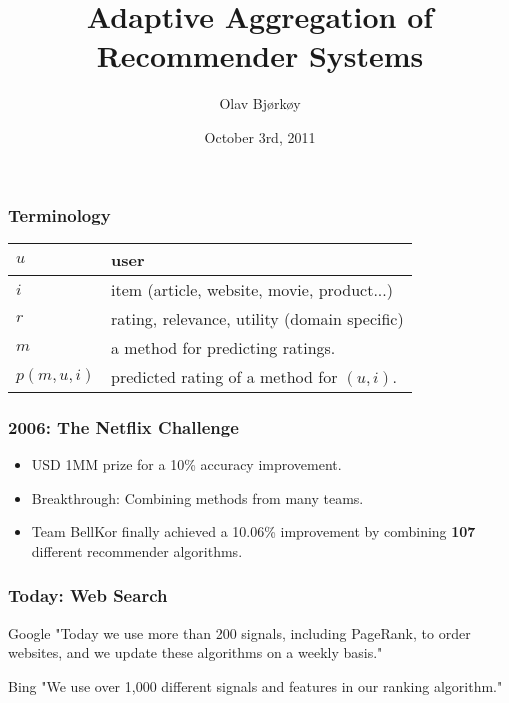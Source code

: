 \documentclass[screen]{beamer}
\title[Adaptive Aggregation of Recommender Systems]%
{Adaptive Aggregation of\\Recommender Systems}
\author{Olav Bj{\o}rk{\o}y}
\institute[NTNU]{Department of Computer and Information Science}
\date{October 3rd, 2011}
\begin{document}
\ntnutitlepage


\begin{frame}
  \frametitle{Terminology}
  \begin{tabular*}{1\textwidth}{ l l }
    \hline
    $u$ & user \\
    \hline
    $i$ & item (article, website, movie, product...)\\
    \hline
    $r$ & rating, relevance, utility (domain specific)\\
    \hline
    $m$ & a method for predicting ratings.\\
    \hline
    $p(m,u,i)$ & predicted rating of a method for $(u,i)$.\\
    \hline
  \end{tabular*}
\end{frame}

\begin{frame}
  \frametitle{2006: The Netflix Challenge}
    \begin{itemize}
      \item USD 1MM prize for a 10\% accuracy improvement.\\
      \item Breakthrough: Combining methods from many teams.\\
      \item Team BellKor finally achieved a 10.06\% improvement by combining \textbf{107} different recommender algorithms.
    \end{itemize}
\end{frame}

\begin{frame}
  \frametitle{Today: Web Search}
    \begin{block}{Google}
      "Today we use more than 200 signals, including PageRank, to order websites, and we update these algorithms on a weekly basis."
    \end{block}
    \begin{block}{Bing}
      "We use over 1,000 different signals and features in our ranking algorithm."
    \end{block}
\end{frame}
\end{document}
